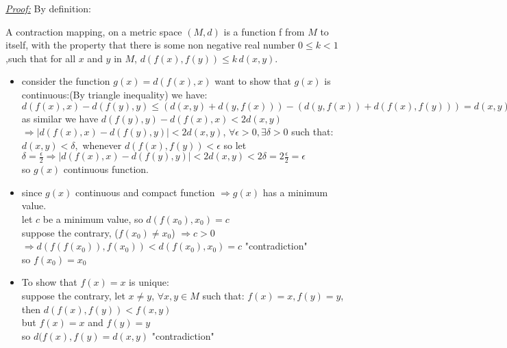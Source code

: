 \documentclass{book}
\begin{document}
\begin{tcolorbox}[enhanced,attach boxed title to top center={yshift=-3mm,yshifttext=-1mm},
colback=blue!5!white,colframe=blue!75!black,colbacktitle=red!80!black,
title=Exercise 42.12:,fonttitle=\bfseries,
boxed title style={size=small,colframe=red!50!black} ]
\textit{\color{blue}\underline{Proof:}}
By definition:
\begin{tcolorbox}[colback=red!5!white,colframe=red!75!black]
A contraction mapping, on a metric space $(M,d)$ is a function f from $M$ to itself, with the property that
there is some non negative real number ${ 
0\leq k<1}$,such that for all $x$ and $y$ in $M$, ${d(f(x),f(y))\leq k\,d(x,y).}$
\end{tcolorbox}
\begin{itemize}
\item consider the function $g(x)=d(f(x),x)$ want to show that $g(x)$ is continuous:{\color{red}(By 
triangle inequality)} we have:\\
$d(f(x),x)-d(f(y),y)\leq (d(x,y)+d(y,f(x)))-(d(y,f(x))+d(f(x),f(y)))=d(x,y)-d(f(x),f(y))<2d(x,y)$\\
as similar we have $d(f(y),y)-d(f(x),x)<2d(x,y)$\\
$\Rightarrow |d(f(x),x)-d(f(y),y)|<2d(x,y)$, $\forall\epsilon>0,\exists\delta>0$ such that:\\
$d(x,y)<\delta,$ whenever $d(f(x),f(y))<\epsilon$ so let $\delta=\frac{\epsilon}{2}\Rightarrow 
|d(f(x),x)-d(f(y),y)|<2d(x,y)<2\delta=2\frac{\epsilon}{2}=\epsilon$\\
so {\color{red}$g(x)$ continuous function.}
\item since $g(x)$ continuous and compact function $\Rightarrow g(x)$ has a minimum value.\\
let $c$ be a minimum value, so $d(f(x_0),x_0)=c$\\
suppose the contrary, ($f(x_0)\neq x_0$) $\Rightarrow c>0$\\
$\Rightarrow d(f(f(x_0)),f(x_0))<d(f(x_0),x_0)=c$ {\color{red}"contradiction"}\\
so $f(x_0)=x_0$
\item To show that $f(x)=x$ is unique:\\
suppose the contrary, let $x\neq y$, $\forall x,y\in M$ such that: $f(x)=x,f(y)=y$, then 
$d(f(x),f(y))<f(x,y)$\\
but $f(x)=x$ and $f(y)=y$\\
so $d(f(x),f(y)=d(x,y)$ {\color{red}"contradiction"}\\
\end{itemize}
\end{tcolorbox}
\end{document}
